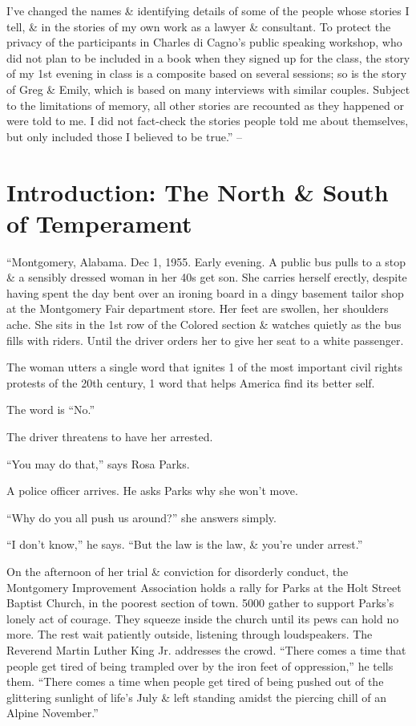 \documentclass{article}
\numberwithin{equation}{section}
\begin{document}
I've changed the names \& identifying details of some of the people whose stories I tell, \& in the stories of my own work as a lawyer \& consultant. To protect the privacy of the participants in Charles di Cagno's public speaking workshop, who did not plan to be included in a book when they signed up for the class, the story of my 1st evening in class is a composite based on several sessions; so is the story of Greg \& Emily, which is based on many interviews with similar couples. Subject to the limitations of memory, all other stories are recounted as they happened or were told to me. I did not fact-check the stories people told me about themselves, but only included those I believed to be true.'' -- \cite[p. 12]{Cain2013}


\section*{Introduction: The North \& South of Temperament}
``Montgomery, Alabama. Dec 1, 1955. Early evening. A public bus pulls to a stop \& a sensibly dressed woman in her 40s get son. She carries herself erectly, despite having spent the day bent over an ironing board in a dingy basement tailor shop at the Montgomery Fair department store. Her feet are swollen, her shoulders ache. She sits in the 1st row of the Colored section \& watches quietly as the bus fills with riders. Until the driver orders her to give her seat to a white passenger.

The woman utters a single word that ignites 1 of the most important civil rights protests of the 20th century, 1 word that helps America find its better self.

The word is ``No.''

The driver threatens to have her arrested.

``You may do that,'' says Rosa Parks.

A police officer arrives. He asks Parks why she won't move.

``Why do you all push us around?'' she answers simply.

``I don't know,'' he says. ``But the law is the law, \& you're under arrest.''

On the afternoon of her trial \& conviction for disorderly conduct, the Montgomery Improvement Association holds a rally for Parks at the Holt Street Baptist Church, in the poorest section of town. 5000 gather to support Parks's lonely act of courage. They squeeze inside the church until its pews can hold no more. The rest wait patiently outside, listening through loudspeakers. The Reverend Martin Luther King Jr. addresses the crowd. ``There comes a time that people get tired of being trampled over by the iron feet of oppression,'' he tells them. ``There comes a time when people get tired of being pushed out of the glittering sunlight of life's July \& left standing amidst the piercing chill of an Alpine November.''
\end{document}
